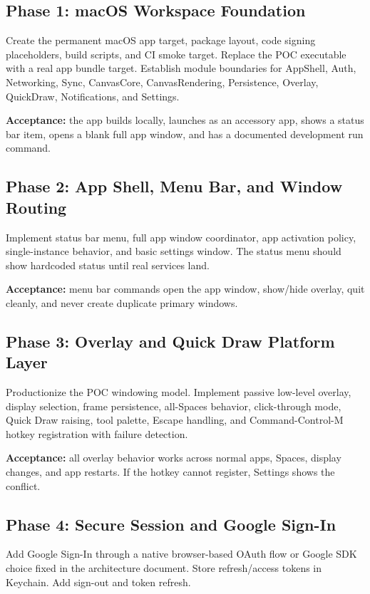 \documentclass[11pt]{article}
\begin{document}
\subsection{Phase 1: macOS Workspace Foundation}

Create the permanent macOS app target, package layout, code signing placeholders, build scripts, and CI smoke target. Replace the POC executable with a real app bundle target. Establish module boundaries for AppShell, Auth, Networking, Sync, CanvasCore, CanvasRendering, Persistence, Overlay, QuickDraw, Notifications, and Settings.

\textbf{Acceptance:} the app builds locally, launches as an accessory app, shows a status bar item, opens a blank full app window, and has a documented development run command.

\subsection{Phase 2: App Shell, Menu Bar, and Window Routing}

Implement status bar menu, full app window coordinator, app activation policy, single-instance behavior, and basic settings window. The status menu should show hardcoded status until real services land.

\textbf{Acceptance:} menu bar commands open the app window, show/hide overlay, quit cleanly, and never create duplicate primary windows.

\subsection{Phase 3: Overlay and Quick Draw Platform Layer}

Productionize the POC windowing model. Implement passive low-level overlay, display selection, frame persistence, all-Spaces behavior, click-through mode, Quick Draw raising, tool palette, Escape handling, and Command-Control-M hotkey registration with failure detection.

\textbf{Acceptance:} all overlay behavior works across normal apps, Spaces, display changes, and app restarts. If the hotkey cannot register, Settings shows the conflict.

\subsection{Phase 4: Secure Session and Google Sign-In}

Add Google Sign-In through a native browser-based OAuth flow or Google SDK choice fixed in the architecture document. Store refresh/access tokens in Keychain. Add sign-out and token refresh.
\end{document}
